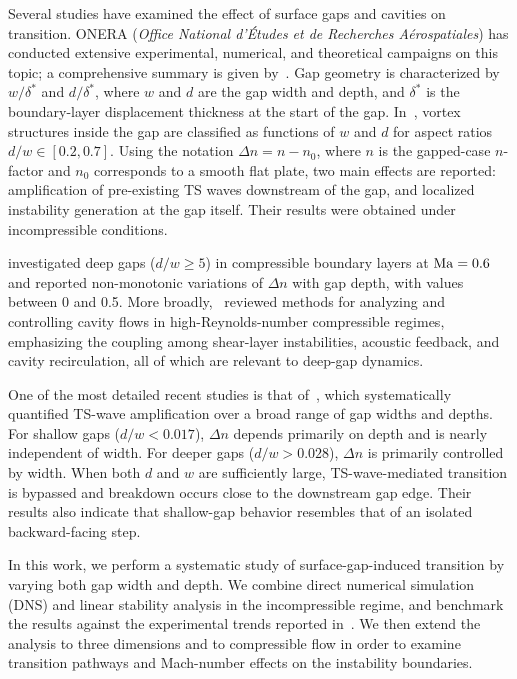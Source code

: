\documentclass[twocolumn,10pt]{tsfp}
\begin{document}
Several studies have examined the effect of surface gaps and cavities on transition. ONERA (\emph{Office National d'Études et de Recherches Aérospatiales}) has conducted extensive experimental, numerical, and theoretical campaigns on this topic; a comprehensive summary is given by~\cite{beguetONERA}. Gap geometry is characterized by $w/\delta^*$ and $d/\delta^*$, where $w$ and $d$ are the gap width and depth, and $\delta^*$ is the boundary-layer displacement thickness at the start of the gap. In~\cite{beguetONERA}, vortex structures inside the gap are classified as functions of $w$ and $d$ for aspect ratios $d/w \in [0.2, 0.7]$. Using the notation $\Delta n = n-n_0$, where $n$ is the gapped-case $n$-factor and $n_0$ corresponds to a smooth flat plate, two main effects are reported: amplification of pre-existing TS waves downstream of the gap, and localized instability generation at the gap itself. Their results were obtained under incompressible conditions.

\cite{zahnRist} investigated deep gaps ($d/w \geq 5$) in compressible boundary layers at $\mathrm{Ma}=0.6$ and reported non-monotonic variations of $\Delta n$ with gap depth, with values between 0 and 0.5. More broadly,~\cite{dynandcontrol} reviewed methods for analyzing and controlling cavity flows in high-Reynolds-number compressible regimes, emphasizing the coupling among shear-layer instabilities, acoustic feedback, and cavity recirculation, all of which are relevant to deep-gap dynamics.

One of the most detailed recent studies is that of~\cite{jeffGaps}, which systematically quantified TS-wave amplification over a broad range of gap widths and depths. For shallow gaps ($d/w < 0.017$), $\Delta n$ depends primarily on depth and is nearly independent of width. For deeper gaps ($d/w > 0.028$), $\Delta n$ is primarily controlled by width. When both $d$ and $w$ are sufficiently large, TS-wave-mediated transition is bypassed and breakdown occurs close to the downstream gap edge. Their results also indicate that shallow-gap behavior resembles that of an isolated backward-facing step.

In this work, we perform a systematic study of surface-gap-induced transition by varying both gap width and depth. We combine direct numerical simulation (DNS) and linear stability analysis in the incompressible regime, and benchmark the results against the experimental trends reported in~\cite{jeffGaps}. We then extend the analysis to three dimensions and to compressible flow in order to examine transition pathways and Mach-number effects on the instability boundaries.
\end{document}
